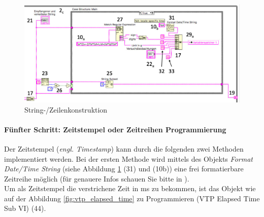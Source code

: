\begin{figure}[h!] %
	\centering
	\includegraphics[width=1\textwidth]{Bilder/LabVIEW_serialport/stringkonstruktion.jpg}
	\vspace{2pt}
	\caption[String-/Zeilenkonstruktion]{String-/Zeilenkonstruktion}
	\label{fig:String-/Zeilenkonstruktion}
\end{figure}


\paragraph{Fünfter Schritt: Zeitstempel oder Zeitreihen Programmierung}  Der Zeitstempel (\textit{engl. Time\-stamp}) kann durch die folgenden zwei Methoden implementiert werden. Bei der ersten Methode wird mittels des Objekts \textit{Format Date/Time String} (siehe Abbildung \ref{fig:String-/Zeilenkonstruktion} (31) und (10b)) eine frei formatierbare Zeitreihe möglich (für genauere Infos schauen Sie bitte in \cite{zeitreihenformatierung}). \\

\noindent Um als Zeitstempel die verstrichene Zeit in ms zu bekommen, ist das Objekt wie auf der Abbildung \ref{fig:vtp_elapsed_time} zu Programmieren (VTP Elapsed Time Sub VI) (44). 




 

